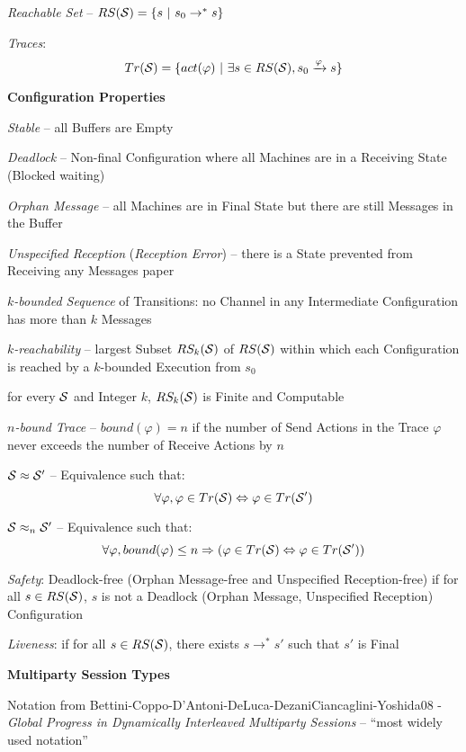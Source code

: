 \emph{Reachable Set} -- $RS(\mathcal{S}) = \{ s\ |\ s_0 \rightarrow^* s\}$

\emph{Traces}:
\[
  Tr(\mathcal{S}) = \{ act(\varphi) \ |\
    \exists s \in RS(\mathcal{S}), s_0 \xrightarrow{\varphi} s \}
\]


\textbf{Configuration Properties}

\emph{Stable} -- all Buffers are Empty

\emph{Deadlock} -- Non-final Configuration where all Machines are in a
Receiving State (Blocked waiting)

\emph{Orphan Message} -- all Machines are in Final State but there are
still Messages in the Buffer

\emph{Unspecified Reception} (\emph{Reception Error}) -- there is a
State prevented from Receiving any Messages %
paper


\emph{$k$-bounded Sequence} of Transitions: no Channel in any
Intermediate Configuration has more than $k$ Messages

\emph{$k$-reachability} -- largest Subset $RS_k(\mathcal{S})$ of
$RS(\mathcal{S})$ within which each Configuration is reached by a
$k$-bounded Execution from $s_0$

for every $\mathcal{S}$ and Integer $k$, $RS_k(\mathcal{S})$ is Finite and
Computable

\emph{$n$-bound Trace} -- $bound(\varphi) = n$ if the number of Send
Actions in the Trace $\varphi$ never exceeds the number of Receive
Actions by $n$

$\mathcal{S} \approx \mathcal{S'}$ -- Equivalence such that:
\[
  \forall \varphi, \varphi \in Tr(\mathcal{S}) \Leftrightarrow
    \varphi \in Tr(\mathcal{S'})
\]

$\mathcal{S} \approx_n \mathcal{S'}$ -- Equivalence such that:
\[
  \forall \varphi, bound(\varphi) \leq n \Rightarrow
    (\varphi \in Tr(\mathcal{S}) \Leftrightarrow
      \varphi \in Tr(\mathcal{S'}))
\]

\emph{Safety}: Deadlock-free (Orphan Message-free and Unspecified
Reception-free) if for all $s \in RS(\mathcal{S})$, $s$ is not a
Deadlock (Orphan Message, Unspecified Reception) Configuration

\emph{Liveness}: if for all $s \in RS(\mathcal{S})$, there exists $s
\rightarrow^* s'$ such that $s'$ is Final


\textbf{Multiparty Session Types}

\fist Notation from
Bettini-Coppo-D'Antoni-DeLuca-DezaniCiancaglini-Yoshida08 -
\emph{Global Progress in Dynamically Interleaved Multiparty Sessions}
-- ``most widely used notation''

